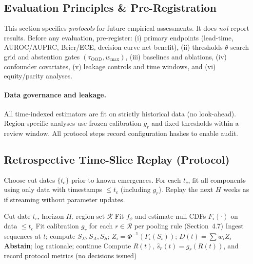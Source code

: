 \documentclass[11pt]{article}
\begin{document}
\subsection{Evaluation Principles \& Pre-Registration}
\label{sec:protocols}
This section specifies \emph{protocols} for future empirical assessments. It does \emph{not} report results.
Before any evaluation, pre-register: (i) primary endpoints (lead-time, AUROC/AUPRC, Brier/ECE, decision-curve net benefit), (ii) thresholds $\theta$ search grid and abstention gates $(\tau_{\text{OOD}}, w_{\max})$, (iii) baselines and ablations, (iv) confounder covariates, (v) leakage controls and time windows, and (vi) equity/parity analyses.

\paragraph{Data governance and leakage.}
All time-indexed estimators are fit on strictly historical data (no look-ahead). Region-specific analyses use frozen calibration $g_r$ and fixed thresholds within a review window. All protocol steps record configuration hashes to enable audit.

\subsection{Retrospective Time-Slice Replay (Protocol)}
Choose cut dates $\{t_c\}$ prior to known emergences. For each $t_c$, fit all components using only data with timestamps $\le t_c$ (including $g_r$). Replay the next $H$ weeks as if streaming without parameter updates.

\begin{algorithm}[H]
\caption{Retrospective time-slice replay (protocol)}
\label{alg:retro}
\begin{algorithmic}[1]
\Require Cut date $t_c$, horizon $H$, region set $\mathcal{R}$
\State Fit $f_\phi$ and estimate null CDFs $F_i(\cdot)$ on data $\le t_c$
\State Fit calibration $g_r$ for each $r\in\mathcal{R}$ per pooling rule (Section~4.7)
  \State Ingest sequences at $t$; compute $S_\Sigma,S_A,S_S$; $Z_i=\Phi^{-1}(F_i(S_i))$; $D(t)=\sum w_i Z_i$
   \State \textbf{Abstain}; log rationale; continue
  \Else \State Compute $R(t)$, $\hat s_r(t)=g_r(R(t))$, and record protocol metrics (no decisions issued)
  \EndIf
\EndFor
\end{algorithmic}
\end{algorithm}
\end{document}
